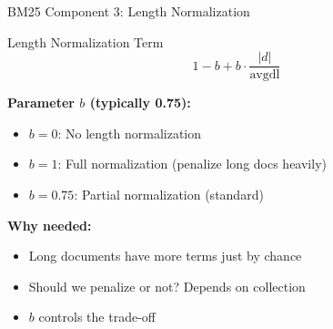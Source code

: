 \documentclass[aspectratio=169]{beamer}
\newif\ifanimated
\newcommand{\cpause}{\ifanimated\pause\fi}
\begin{document}
\begin{frame}[shrink=10]{BM25 Component 3: Length Normalization}
\begin{block}{Length Normalization Term}
$$1 - b + b \cdot \frac{|d|}{\text{avgdl}}$$
\end{block}

\textbf{Parameter $b$ (typically 0.75):}
\begin{itemize}
    \item $b = 0$: No length normalization
    \item $b = 1$: Full normalization (penalize long docs heavily)
    \item $b = 0.75$: Partial normalization (standard)
\end{itemize}\cpause

\vspace{1em}

\textbf{Why needed:}
\begin{itemize}
    \item Long documents have more terms just by chance
    \item Should we penalize or not? Depends on collection
    \item $b$ controls the trade-off
\end{itemize}\cpause
\end{frame}


\end{document}
